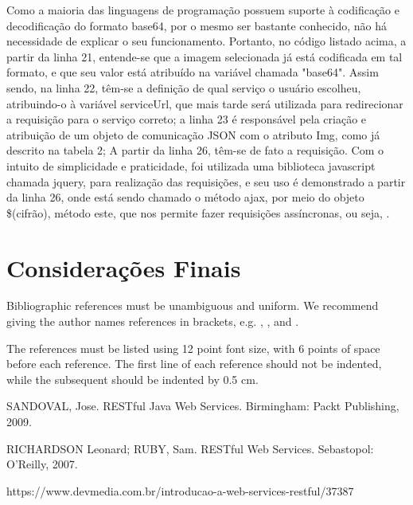 \documentclass[12pt]{article}
\begin{document}
Como a maioria das linguagens de programação possuem suporte à codificação e decodificação do formato base64, por o mesmo ser bastante conhecido, não há necessidade de explicar o seu funcionamento. Portanto, no código listado acima, a partir da linha 21, entende-se que a imagem selecionada já está codificada em tal formato, e que seu valor está atribuído na variável chamada "base64". Assim sendo, na linha 22, têm-se a definição de qual serviço o usuário escolheu, atribuindo-o à variável serviceUrl, que mais tarde será utilizada para redirecionar a requisição para o serviço correto; a linha 23 é responsável pela criação e atribuição de um objeto de comunicação JSON com o atributo Img, como já descrito na tabela 2; A partir da linha 26, têm-se de fato a requisição. Com o intuito de simplicidade e praticidade, foi utilizada uma biblioteca javascript chamada jquery, para realização das requisições, e seu uso é demonstrado a partir da linha 26, onde está sendo chamado o método ajax, por meio do objeto \$(cifrão), método este, que nos permite fazer requisições assíncronas, ou seja, .

\section{Considerações Finais}


Bibliographic references must be unambiguous and uniform.  We recommend giving
the author names references in brackets, e.g. \cite{knuth:84},
\cite{boulic:91}, and \cite{smith:99}.

The references must be listed using 12 point font size, with 6 points of space
before each reference. The first line of each reference should not be
indented, while the subsequent should be indented by 0.5 cm.

SANDOVAL, Jose. RESTful Java Web Services. Birmingham: Packt Publishing,
2009.

RICHARDSON Leonard; RUBY, Sam. RESTful Web Services. Sebastopol: O'Reilly,
2007.

https://www.devmedia.com.br/introducao-a-web-services-restful/37387



\end{document}
